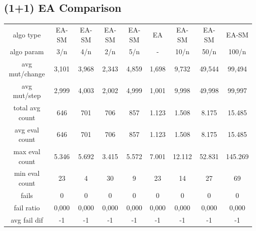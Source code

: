 \subsection{(1+1) EA Comparison}
\begin{tabular}[h]{ccccccccc}
algo type&          EA-SM&   EA-SM&   EA-SM&   EA-SM&      EA&   EA-SM&   EA-SM&   EA-SM\\
algo param&           3/n&     4/n&     2/n&     5/n&       -&    10/n&    50/n&   100/n\\
avg mut/change&     3,101&   3,968&   2,343&   4,859&   1,698&   9,732&  49,544&  99,494\\
avg mut/step&       2,999&   4,003&   2,002&   4,999&   1,001&   9,998&  49,998&  99,997\\
\hline
total avg count&      646&     701&     706&     857&   1.123&   1.508&   8.175&  15.485\\
avg eval count&       646&     701&     706&     857&   1.123&   1.508&   8.175&  15.485\\
max eval count&     5.346&   5.692&   3.415&   5.572&   7.001&  12.112&  52.831& 145.269\\
min eval count&        23&       4&      30&       9&      23&      14&      27&      69\\
\hline
fails&                  0&       0&       0&       0&       0&       0&       0&       0\\
fail ratio&         0,000&   0,000&   0,000&   0,000&   0,000&   0,000&   0,000&   0,000\\
avg fail dif&          -1&      -1&      -1&      -1&      -1&      -1&      -1&      -1\\
\end{tabular}
